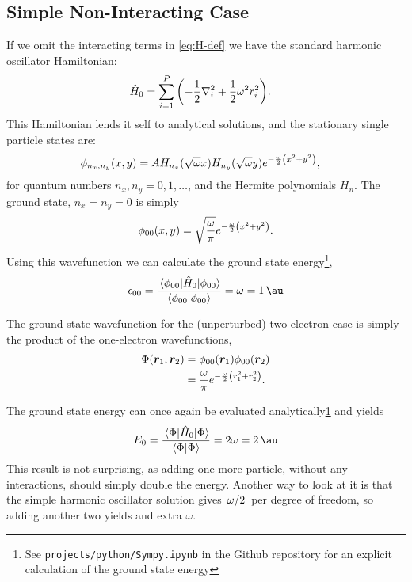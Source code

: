 \documentclass[a4paper, 11pt]{article}
\begin{document}
\begin{multicols}{2}
    \subsection{Simple Non-Interacting Case}
    If we omit the interacting terms in \autoref{eq:H-def} we have
    the standard harmonic oscillator Hamiltonian:
    \begin{align}
        \hat H_0 &= \sum_{i=1}^P\qty(-\frac{1}{2}\laplacian_i +
        \frac{1}{2}\omega^2 r_i^2).
    \end{align}
    This Hamiltonian lends it self to analytical solutions, and the stationary
    single particle states are:
    \begin{align}
        \phi_{n_x, n_y}(x, y) &= A H_{n_x}(\sqrt\omega x)H_{n_y}(\sqrt\omega y)
        e^{-\frac{\omega}{2}\qty(x^2 + y^2)},
    \end{align} 
    for quantum numbers $n_x, n_y = 0, 1,\dots$, and the Hermite polynomials
    $H_n$. The ground state, $n_x=n_y=0$ is simply
    \begin{align}
        \phi_{00}(x,y) =
        \sqrt{\frac{\omega}{\pi}}e^{-\frac{\omega}{2}\qty(x^2+y^2)}.
    \end{align}
    Using this wavefunction we can calculate the ground state
    energy\footnote{\label{fnt:sympy}See \texttt{projects/python/Sympy.ipynb} in the Github
    repository for an explicit calculation of the ground state energy},
    \begin{align}
        \epsilon_{00} = \frac{\expval{\hat H_0}{\phi_{00}}}{\braket{\phi_{00}}}
        = \omega = \SI{1}{\au}
    \end{align}

    The ground state wavefunction for the (unperturbed) two-electron case is simply the
    product of the one-electron wavefunctions,
    \begin{align}
        \begin{split}
            \Phi(\bm r_1, \bm r_2) &= \phi_{00}(\bm r_1)\phi_{00}(\bm r_2)\\
            &= \frac{\omega}{\pi} e^{-\frac{\omega}{2}\qty(r_1^2+r_2^2)}.
        \end{split}\label{eq:Phi-non-inter}
    \end{align}

    The ground state energy can once again be evaluated
    analytically\cref{fnt:sympy} and yields
    \begin{align}
        E_0 = \frac{\expval{\hat H_0}{\Phi}}{\braket{\Phi}}
        = 2\omega =\SI{2}{\au}
    \end{align}
    This result is not surprising, as adding one more particle, without any
    interactions, should simply double the energy. Another way to look at it is
    that the simple harmonic oscillator solution gives $\flatfrac{\omega}{2}$
    per degree of freedom, so adding another two yields and extra $\omega$.



\end{multicols}
\end{document}
